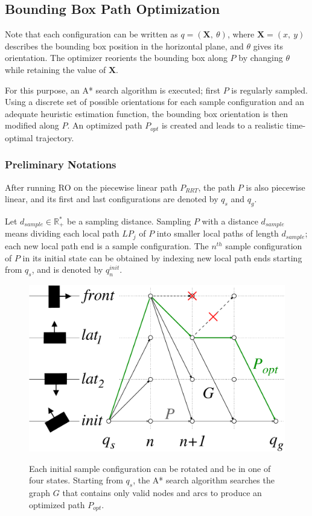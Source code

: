 \subsection{Bounding Box Path Optimization}
Note that each configuration \config{} can be written as $q =
(\mathbf{X},~\theta)$, where $\mathbf{X} = (x,~y)$ describes the
bounding box position in the horizontal plane, and $\theta$ gives its
orientation.  The optimizer reorients the bounding box along $P$ by
changing $\theta$ while retaining the value of $\mathbf{X}$.

For this purpose, an A* search algorithm is executed; first $P$ is
regularly sampled. Using a discrete set of possible orientations for
each sample configuration and an adequate heuristic estimation
function, the bounding box orientation is then modified along $P$. An
optimized path $P_{opt}$ is created and leads to a realistic
time-optimal trajectory.

\subsubsection{Preliminary Notations}
After running RO on the piecewise linear path $P_{RRT}$, the
path $P$ is also piecewise linear, and its first and last
configurations are denoted by $q_s$ and $q_g$.

Let $d_{sample} \in \mathbb{R}_+^*$ be a sampling distance. Sampling
$P$ with a distance $d_{sample}$ means dividing each local path $LP_j$
of $P$ into smaller local paths of length $d_{sample}$; each new local
path end is a sample configuration. The $n^{th}$ sample configuration
of $P$ in its initial state can be obtained by indexing new local path
ends starting from $q_s$, and is denoted by $q_n^{init}$.

\begin{figure}
  \centering
      {\includegraphics[width = 0.75\linewidth]
        {src/chap1-path-optimization/A-star.pdf}}
      \caption{Each initial sample configuration can be rotated and be
        in one of four states. Starting from $q_s$, the A* search
        algorithm searches the graph $G$ that contains only valid
        nodes and arcs to produce an optimized path $P_{opt}$.}
      \label{fig:chap1-A-star}
\end{figure}

